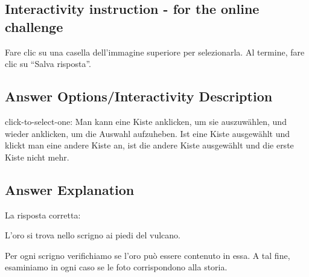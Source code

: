 \documentclass[a4paper,11pt]{report}
\newcommand{\taskGraphicsFolder}{..}
\begin{document}
\subsection*{Interactivity instruction - for the online challenge}

Fare clic su una casella dell’immagine superiore per selezionarla. Al termine, fare clic su \enquote{Salva risposta}.

\begingroup
\renewcommand{\arraystretch}{1.5}
\subsection*{Answer Options/Interactivity Description}

click-to-select-one:  Man kann eine Kiste anklicken, um sie auszuwählen, und wieder anklicken, um die Auswahl aufzuheben.  Ist eine Kiste ausgewählt und klickt man eine andere Kiste an, ist die andere Kiste ausgewählt und die erste Kiste nicht mehr.

\endgroup

\subsection*{Answer Explanation}

La risposta corretta:

{\centering%
\par}

L’oro si trova nello scrigno ai piedi del vulcano.

Per ogni scrigno verifichiamo se l’oro può essere contenuto in essa. A tal fine, esaminiamo in ogni caso se le foto corrispondono alla storia.
\end{document}
